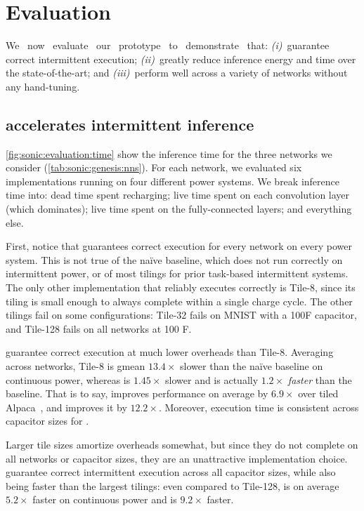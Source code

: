 \section{Evaluation}
\label{sonic:evaluation}

We ~now ~evaluate ~our ~prototype ~to ~demonstrate ~that:
%
\emph{(i)}~\sonictails guarantee correct intermittent execution;
%
\emph{(ii)}~\sonictails greatly reduce inference energy and time over
the state-of-the-art; and
%
\emph{(iii)}~\sonictails perform well across a variety of networks
without any hand-tuning.

\subsection{\sonictails accelerates intermittent inference}

\figSONICEvalTime

\autoref{fig:sonic:evaluation:time} show the inference time for the three
networks we consider (\autoref{tab:sonic:genesis:nns}).
%
For each network, we evaluated six implementations running on four different power systems.
%
We break inference time into:
dead time spent recharging;
live time spent on each convolution layer (which dominates);
live time spent on the fully-connected layers;
and everything else.

First, notice that \sonictails guarantees correct execution for every
network on every power system.
%
This is not true of the na\"ive baseline, which does not run correctly
on intermittent power, or of most tilings for prior task-based
intermittent systems.
%
The only other implementation that reliably executes correctly is
Tile-8, since its tiling is small enough to always complete within a
single charge cycle.
%
The other tilings fail on some configurations: Tile-32 fails on
MNIST with a 100\textmu F capacitor, and Tile-128 fails on all networks at 100\textmu
F.

\sonictails guarantee correct execution at much lower
overheads than Tile-8.
%
Averaging across networks, Tile-8 is gmean $13.4\times$ slower than the
na\"ive baseline on continuous power, whereas \sonic is $1.45\times$ slower and 
\tails is actually $1.2\times$ \emph{faster} than the baseline.
%
That is to say, \sonic improves performance on average by $6.9\times$ over tiled Alpaca~\cite{alpaca},
and \tails improves it by $12.2\times$.
%
Moreover, execution time is consistent across capacitor sizes for \sonictails.

Larger tile sizes amortize overheads somewhat, but since they do not
complete on all networks or capacitor sizes, they are an unattractive
implementation choice.
%
\sonictails guarantee correct intermittent execution across all capacitor
sizes, while also being faster than the largest tilings: even compared
to Tile-128, \sonic is on average $5.2\times$ faster on continuous power and \tails
is $9.2\times$ faster.

